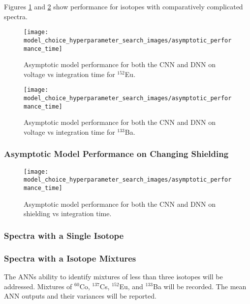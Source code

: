 Figures \ref{fig:model_asymptotic_performance_eu152} and \ref{fig:model_asymptotic_performance_ba133} show performance for isotopes with comparatively complicated spectra.

\begin{figure}[H]
	\centering
	\texttt{[image: model\_choice\_hyperparameter\_search\_images/asymptotic\_performance\_time]}
	\caption{Asymptotic model performance for both the CNN and DNN on voltage vs integration time for $^{152}$Eu.}
	\label{fig:model_asymptotic_performance_eu152}
\end{figure}

\begin{figure}[H]
	\centering
	\texttt{[image: model\_choice\_hyperparameter\_search\_images/asymptotic\_performance\_time]}
	\caption{Asymptotic model performance for both the CNN and DNN on voltage vs integration time for $^{133}$Ba.}
	\label{fig:model_asymptotic_performance_ba133}
\end{figure}

\subsubsection{Asymptotic Model Performance on Changing Shielding}

\begin{figure}[H]
	\centering
	\texttt{[image: model\_choice\_hyperparameter\_search\_images/asymptotic\_performance\_time]}
	\caption{Asymptotic model performance for both the CNN and DNN on shielding vs integration time.}
	\label{fig:asymptotic_performance}
\end{figure}



\subsubsection{Spectra with a Single Isotope}

\subsubsection{Spectra with a Isotope Mixtures}


The ANNs ability to identify mixtures of less than three isotopes will be addressed. Mixtures of $^{60}$Co, $^{137}$Cs, $^{152}$Eu, and $^{133}$Ba will be recorded. The mean ANN outputs and their variances will be reported.